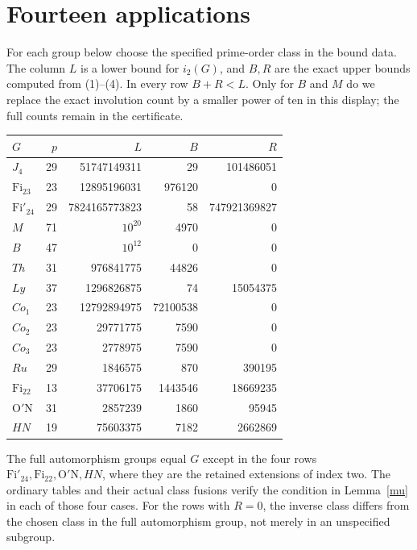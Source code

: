\documentclass[11pt,a4paper]{article}
\newcommand{\ii}{i_2}
\begin{document}
\section{Fourteen applications}
For each group below choose the specified prime-order class in the
bound data. The column $L$ is a lower bound for $\ii(G)$, and $B,R$
are the exact upper bounds computed from (1)--(4). In every row
$B+R<L$. Only for $B$ and $M$ do we replace the exact involution count
by a smaller power of ten in this display; the full counts remain in
the certificate.
\begin{center}\small
\begin{tabular}{lrrrr}\toprule
$G$&$p$&$L$&$B$&$R$\\\midrule
$J_4$&29&51747149311&29&101486051\\
$\mathrm{Fi}_{23}$&23&12895196031&976120&0\\
$\mathrm{Fi}'_{24}$&29&7824165773823&58&747921369827\\
$M$&71&$10^{20}$&4970&0\\
$B$&47&$10^{12}$&0&0\\
$Th$&31&976841775&44826&0\\
$Ly$&37&1296826875&74&15054375\\
$Co_1$&23&12792894975&72100538&0\\
$Co_2$&23&29771775&7590&0\\
$Co_3$&23&2778975&7590&0\\
$Ru$&29&1846575&870&390195\\
$\mathrm{Fi}_{22}$&13&37706175&1443546&18669235\\
$\mathrm{O'N}$&31&2857239&1860&95945\\
$HN$&19&75603375&7182&2662869\\\bottomrule
\end{tabular}
\end{center}
The full automorphism groups equal $G$ except in the four rows
$\mathrm{Fi}'_{24},\mathrm{Fi}_{22},\mathrm{O'N},HN$, where they
are the retained extensions of index two. The ordinary tables and
their actual class fusions verify the condition in Lemma~\ref{mu}
in each of those four cases. For the rows with $R=0$, the inverse
class differs from the chosen class in the full automorphism group,
not merely in an unspecified subgroup.
\end{document}
